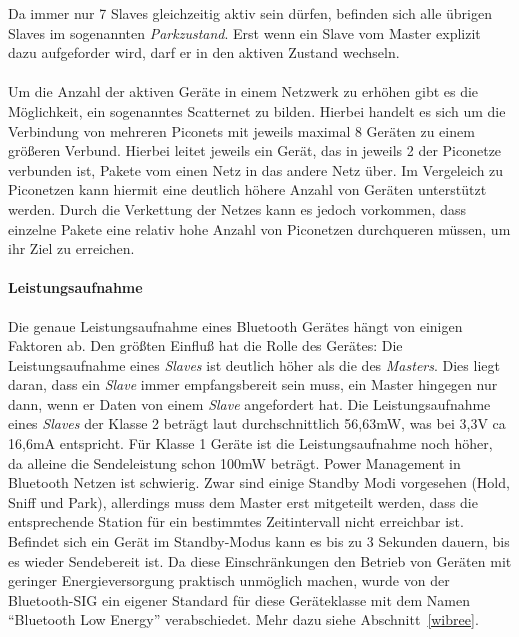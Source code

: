                 Da immer nur 7 Slaves gleichzeitig aktiv sein dürfen, befinden sich 
                alle übrigen Slaves im sogenannten \textsl{Parkzustand}. Erst wenn
                ein Slave vom Master explizit dazu aufgeforder wird, darf er in den
                aktiven Zustand wechseln. \\
                \\
                Um die Anzahl der aktiven Geräte in einem Netzwerk zu erhöhen
                gibt es die Möglichkeit, ein sogenanntes Scatternet zu bilden.
                Hierbei handelt es sich um die Verbindung von mehreren Piconets
                mit jeweils maximal 8 Geräten zu einem größeren Verbund. Hierbei
                leitet jeweils ein Gerät, das in jeweils 2 der Piconetze 
                verbunden ist, Pakete vom einen Netz in das andere Netz über.
                Im Vergeleich zu Piconetzen kann hiermit eine deutlich höhere
                Anzahl von Geräten unterstützt werden. Durch die Verkettung 
                der Netzes kann es jedoch vorkommen, dass einzelne Pakete
                eine relativ hohe Anzahl von Piconetzen durchqueren müssen,
                um ihr Ziel zu erreichen.
            \paragraph{Leistungsaufnahme}
                Die genaue Leistungsaufnahme eines Bluetooth Gerätes hängt von 
                einigen Faktoren ab. Den größten Einfluß hat die Rolle des 
                Gerätes: Die Leistungsaufnahme eines \textsl{Slaves} ist
                deutlich höher als die des \textsl{Masters}. Dies liegt
                daran, dass ein \textsl{Slave} immer empfangsbereit sein
                muss, ein Master hingegen nur dann, wenn er Daten von
                einem \textsl{Slave} angefordert hat. Die Leistungsaufnahme
                eines \textsl{Slaves} der Klasse 2 beträgt laut \citep{BluetoothPower}
                durchschnittlich 56,63mW, was bei 3,3V ca 16,6mA entspricht.
                Für Klasse 1 Geräte ist die Leistungsaufnahme noch höher, 
                da alleine die Sendeleistung schon 100mW beträgt.
                Power Management in Bluetooth Netzen ist schwierig. Zwar sind
                einige Standby Modi vorgesehen (Hold, Sniff und Park), allerdings
                muss dem Master erst mitgeteilt werden, dass die entsprechende
                Station für ein bestimmtes Zeitintervall nicht erreichbar ist.
                Befindet sich ein Gerät im Standby-Modus kann es bis zu 3 Sekunden
                dauern, bis es wieder Sendebereit ist. Da diese Einschränkungen
                den Betrieb von Geräten mit geringer Energieversorgung
                praktisch unmöglich machen, wurde von der Bluetooth-SIG
                ein eigener Standard für diese Geräteklasse mit dem Namen
                "`Bluetooth Low Energy"' verabschiedet. Mehr dazu siehe
                Abschnitt~\ref{wibree}.

